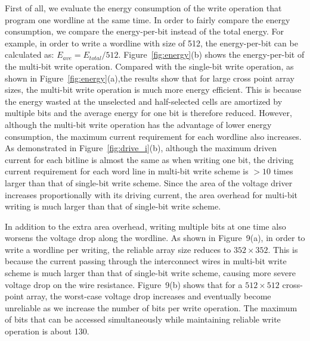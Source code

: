 First of all, we evaluate the energy consumption of the write operation
that program one wordline at the same time. In order to fairly compare the
energy consumption, we compare the energy-per-bit instead of the total
energy. For example, in order to write a wordline with size of 512, the
energy-per-bit can be calculated as: $E_{ave}=E_{total}/512$.
Figure~\ref{fig:energy}(b) shows the energy-per-bit of the multi-bit write
operation. Compared with the single-bit write operation, as shown in
Figure~\ref{fig:energy}(a),the results show that for large cross point
array sizes, the multi-bit write operation is much more energy efficient.
This is because the energy wasted at the unselected and half-selected
cells are amortized by multiple bits and the average energy for one bit is
therefore reduced. However, although the multi-bit write operation has the
advantage of lower energy consumption, the maximum current requirement for
each wordline also increases. As demonstrated in
Figure~\ref{fig:drive_i}(b), although the maximum driven current for each
bitline is almost the same as when writing one bit, the driving current
requirement for each word line in multi-bit write scheme is $>10$ times
larger than that of single-bit write scheme. Since the area of the voltage
driver increases proportionally with its driving current, the area
overhead for multi-bit writing is much larger than that of single-bit
write scheme.



In addition to the extra area overhead, writing multiple bits at one time
also worsens the voltage drop along the wordline. As shown in Figure~9(a),
in order to write a wordline per writing, the reliable array size reduces
to $352 \times 352$. This is because the current passing through the
interconnect wires in multi-bit write scheme is much larger than that of
single-bit write scheme, causing more severe voltage drop on the wire
resistance. Figure~9(b) shows that for a $512\times 512$ cross-point
array, the worst-case voltage drop increases and eventually become
unreliable as we increase the number of bits per write operation. The
maximum of bits that can be accessed simultaneously while maintaining
reliable write operation is about 130.

